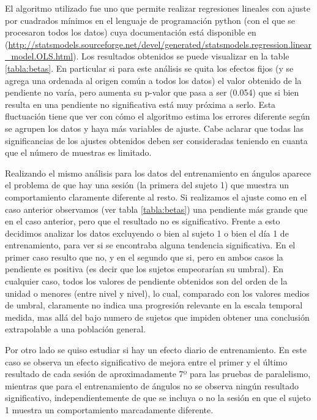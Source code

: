 \documentclass{article}
\numberwithin{figure}{section}
\begin{document}
    El algoritmo utilizado fue uno que permite realizar regresiones lineales con ajuste por cuadrados mínimos en el lenguaje de programación python (con el que se procesaron todos los datos) cuya documentación está disponible en (\url{http://statsmodels.sourceforge.net/devel/generated/statsmodels.regression.linear_model.OLS.html}). Los resultados obtenidos se puede visualizar en la table \ref{tabla:betas}. En particular si para este análisis se quita los efectos fijos (y se agrega una ordenada al origen común a todos los datos) el valor obtenido de la pendiente no varía, pero aumenta su p-valor que pasa a ser (0.054) que si bien resulta en una pendiente no significativa está muy próxima a serlo. Esta fluctuación tiene que ver con cómo el algoritmo estima los errores diferente según se agrupen los datos y haya más variables de ajuste. Cabe aclarar que todas las significancias de los ajustes obtenidos deben ser consideradas teniendo en cuanta que el número de muestras es limitado.
    
    Realizando el mismo análisis para los datos del entrenamiento en ángulos aparece el problema de que hay una sesión (la primera del sujeto 1) que muestra un comportamiento claramente diferente al resto. Si realizamos el ajuste como en el caso anterior observamos (ver tabla \ref{tabla:betas}) una pendiente más grande que en el caso anterior, pero que el resultado no es significativo. Frente a esto decidimos analizar los datos excluyendo o bien al sujeto 1 o bien el día 1 de entrenamiento, para ver si se encontraba alguna tendencia significativa. En el primer caso resulto que no, y en el segundo que si, pero en ambos casos la pendiente es positiva (es decir que los sujetos empeorarían su umbral). En cualquier caso, todos los valores de pendiente obtenidos son del orden de la unidad o menores (entre nivel y nivel), lo cual, comparado con los valores medios de umbral, claramente no indica una progresión relevante en la escala temporal medida, mas allá del bajo numero de sujetos que impiden obtener una conclusión extrapolable a una población general.  
    
    Por otro lado se quiso estudiar si hay un efecto diario de entrenamiento. En este caso se observa un efecto significativo de mejora entre el primer y el último resultado de cada sesión de aproximadamente 7º para las pruebas de paralelismo, mientras que para el entrenamiento de ángulos no se observa ningún resultado significativo,  independientemente de que se incluya o no la sesión en que el sujeto 1 muestra un comportamiento marcadamente diferente.
    
\end{document}

